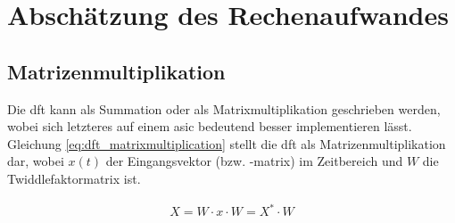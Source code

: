 \section{Abschätzung des Rechenaufwandes}\label{sec:abschaetzung_Rechenaufwand}

\subsection{Matrizenmultiplikation}

Die \gls{dft} kann als Summation oder als Matrixmultiplikation geschrieben werden, wobei sich letzteres auf einem \gls{asic} bedeutend besser implementieren lässt. 
Gleichung \ref{eq:dft_matrixmultiplication} stellt die \gls{dft} als Matrizenmultiplikation dar, wobei $x(t)$ der Eingangsvektor (bzw. -matrix) im Zeitbereich und $W$ 
die Twiddlefaktormatrix ist.

\begin{align}\label{eq:dft_matrixmultiplication}
 X = W \cdot x \cdot W = X^* \cdot W
\end{align}

% 
% 
% 
% 
  
